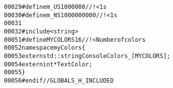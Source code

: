 \begin{footnotesize}
\begin{alltt}
00029 \textcolor{preprocessor}{}\textcolor{preprocessor}{    #define m\_US 1000000 //!< 1s}
00030 \textcolor{preprocessor}{}\textcolor{preprocessor}{    #define m\_NS 1000000000 //!< 1s}
00031 \textcolor{preprocessor}{}
00032 \textcolor{preprocessor}{    #include <string>}
00051 \textcolor{preprocessor}{    #define MYCOLORS 16 //!< Number of colors}
00052 \textcolor{preprocessor}{}\textcolor{keyword}{namespace }myColors\{
00053     \textcolor{keyword}{extern} std::string ConsoleColors\_[MYCOLORS]; 
00054     \textcolor{keyword}{extern} \textcolor{keywordtype}{int} *TextColor; 
00055 \}
00056 \textcolor{preprocessor}{#endif // GLOBALS\_H\_INCLUDED}
\end{alltt}\end{footnotesize}
